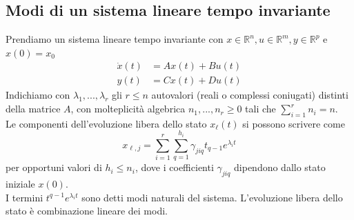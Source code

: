\documentclass{article}
\begin{document}
\subsection{Modi di un sistema lineare tempo invariante}
Prendiamo un sistema lineare tempo invariante con $x \in \mathbb{R}^n, u \in \mathbb{R}^m, y \in \mathbb{R}^p$ e $x(0)=x_0$
\begin{align*}
    \dot x(t) &= A x(t) + B u(t)\\
    y(t) &= C x(t) + D u(t)
\end{align*}
Indichiamo con $\lambda_1,...,\lambda_r$ gli $r \leq n$ autovalori (reali o complessi coniugati) distinti della matrice $A$, con molteplicità algebrica $n_1,...,n_r \geq 0$ tali che $\sum\limits ^r_{i=1} n_i = n$.\\
Le componenti dell'evoluzione libera dello stato $x_\ell(t)$ si possono scrivere come
\[
    x_{\ell,j} = \sum^r_{i=1}\sum^{h_i}_{q=1} \gamma_{jiq}t_{q-1}e^{\lambda_i t} \tag*{$j=1,...,n$}
\]
per opportuni valori di $h_i \leq n_i$, dove i coefficienti $\gamma_{jiq}$ dipendono dallo stato iniziale $x(0)$.\\
I termini $t^{q-1}e^{\lambda_i t}$  sono detti modi naturali del sistema.
L'evoluzione libera dello stato è combinazione lineare dei modi.
\end{document}
